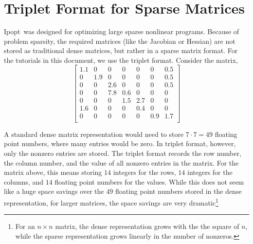\documentclass[letter,10pt]{article}
\newcommand{\Ipopt}{{\sc Ipopt}}
\begin{document}
 
 



\appendix
\newpage
\section{Triplet Format for Sparse Matrices}\label{app.triplet}
\Ipopt\ was designed for optimizing large sparse nonlinear programs. 
Because of problem sparsity, the required matrices (like the Jacobian or Hessian) are not stored as traditional dense matrices, but rather in a sparse matrix format. For the tutorials in this document, we use the triplet format. 
Consider the matrix,
\begin{equation}
\label{eqn.ex_matrix}
\left[
\begin{array}{ccccccc}
1.1     & 0             & 0             & 0             & 0             & 0             & 0.5 \\
0       & 1.9   & 0             & 0             & 0             & 0             & 0.5 \\
0       & 0             & 2.6   & 0             & 0             & 0             & 0.5 \\
0       & 0             & 7.8   & 0.6   & 0             & 0             & 0    \\
0       & 0             & 0             & 1.5   & 2.7   & 0             & 0     \\
1.6     & 0             & 0             & 0             & 0.4   & 0             & 0     \\
0       & 0             & 0             & 0             & 0             & 0.9   & 1.7 \\
\end{array}
\right]
\end{equation}

A standard dense matrix representation would need to store $7 \cdot
7{=} 49$ floating point numbers, where many entries would be zero. In
triplet format, however, only the nonzero entries are stored. The
triplet format records the row number, the column number, and the
value of all nonzero entries in the matrix. For the matrix above, this
means storing $14$ integers for the rows, $14$ integers for the
columns, and $14$ floating point numbers for the values. While this
does not seem like a huge space savings over the $49$ floating point
numbers stored in the dense representation, for larger matrices, the
space savings are very dramatic\footnote{For an $n \times n$ matrix,
the dense representation grows with the the square of $n$, while the
sparse representation grows linearly in the number of nonzeros.}
\end{document}
